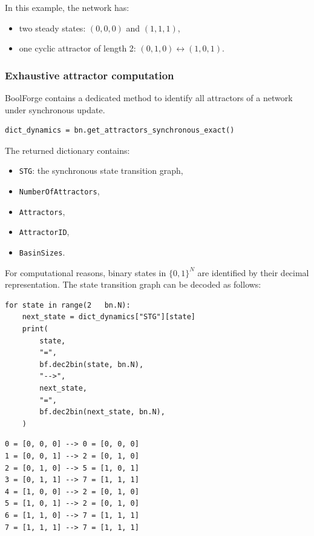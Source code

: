 \documentclass[
]{article}
\providecommand{\tightlist}{%
  \setlength{\itemsep}{0pt}\setlength{\parskip}{0pt}}
\begin{document}
In this example, the network has:

\begin{itemize}
\tightlist
\item
  two steady states: \((0,0,0)\) and \((1,1,1)\),
\item
  one cyclic attractor of length 2: \((0,1,0) \leftrightarrow (1,0,1)\).
\end{itemize}

\subsubsection{Exhaustive attractor
computation}\label{exhaustive-attractor-computation}

BoolForge contains a dedicated method to identify all attractors of a
network under synchronous update.

\begin{lstlisting}
dict_dynamics = bn.get_attractors_synchronous_exact()
\end{lstlisting}

The returned dictionary contains:

\begin{itemize}
\tightlist
\item
  \texttt{STG}: the synchronous state transition graph,
\item
  \texttt{NumberOfAttractors},
\item
  \texttt{Attractors},
\item
  \texttt{AttractorID},
\item
  \texttt{BasinSizes}.
\end{itemize}

For computational reasons, binary states in \(\{0,1\}^N\) are identified
by their decimal representation. The state transition graph can be
decoded as follows:

\begin{lstlisting}
for state in range(2   bn.N):
    next_state = dict_dynamics["STG"][state]
    print(
        state,
        "=",
        bf.dec2bin(state, bn.N),
        "-->",
        next_state,
        "=",
        bf.dec2bin(next_state, bn.N),
    )
\end{lstlisting}

\begin{lstlisting}
0 = [0, 0, 0] --> 0 = [0, 0, 0]
1 = [0, 0, 1] --> 2 = [0, 1, 0]
2 = [0, 1, 0] --> 5 = [1, 0, 1]
3 = [0, 1, 1] --> 7 = [1, 1, 1]
4 = [1, 0, 0] --> 2 = [0, 1, 0]
5 = [1, 0, 1] --> 2 = [0, 1, 0]
6 = [1, 1, 0] --> 7 = [1, 1, 1]
7 = [1, 1, 1] --> 7 = [1, 1, 1]
\end{lstlisting}
\end{document}
